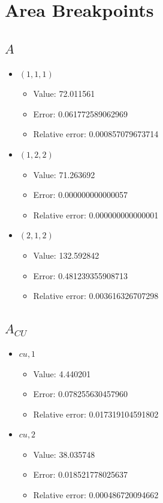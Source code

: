 \documentclass{article}%
\begin{document}
\section{Area Breakpoints}%
\thispagestyle{plain}%
\subsection{$A$}%
\begin{itemize}%
	\item $(1, 1, 1)$%
	\begin{itemize}%
		\item Value: 72.011561%
		\item Error: 0.061772589062969%
		\item Relative error: 0.000857079673714%
	\end{itemize}%
	\item $(1, 2, 2)$%
	\begin{itemize}%
		\item Value: 71.263692%
		\item Error: 0.000000000000057%
		\item Relative error: 0.000000000000001%
	\end{itemize}%
	\item $(2, 1, 2)$%
	\begin{itemize}%
		\item Value: 132.592842%
		\item Error: 0.481239355908713%
		\item Relative error: 0.003616326707298%
	\end{itemize}%
\end{itemize}%
\subsection{$A_{CU}$}%
\begin{itemize}%
	\item $\textit{cu},1$%
	\begin{itemize}%
		\item Value: 4.440201%
		\item Error: 0.078255630457960%
		\item Relative error: 0.017319104591802%
	\end{itemize}%
	\item $\textit{cu},2$%
	\begin{itemize}%
		\item Value: 38.035748%
		\item Error: 0.018521778025637%
		\item Relative error: 0.000486720094662%
	\end{itemize}%
\end{itemize}%
\end{document}

